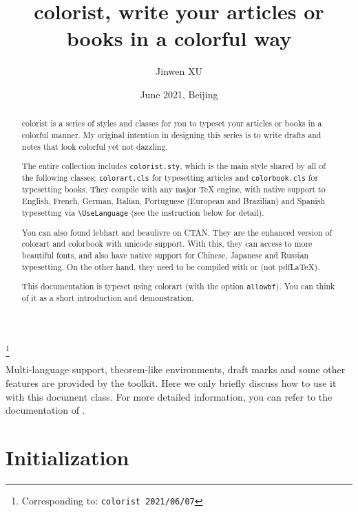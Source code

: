 \documentclass[allowbf,puretext]{colorart}
\theoremstyle{basic}
\theoremstyle{emphasis}
\theoremstyle{simple}
\newenvironment{tip}[1][Tip]{%
    \begin{tcolorbox}[breakable,
        enhanced,
        width = \textwidth,
        colback = paper, colbacktitle = paper,
        colframe = gray!50, boxrule=0.2mm,
        coltitle = black,
        fonttitle = \sffamily,
        attach boxed title to top left = {yshift=-\tcboxedtitleheight/2, xshift=.5cm},
        boxed title style = {boxrule=0pt, colframe=paper},
        before skip = 0.3cm,
        after skip = 0.3cm,
        top = 3mm,
        bottom = 3mm,
        title={\scshape\sffamily #1}]%
}{\end{tcolorbox}}
\providecommand{\colorist}{{\normalfont\textsf{colorist}}}
\providecommand{\colorart}{{\normalfont\textsf{colorart}}}
\providecommand{\colorbook}{{\normalfont\textsf{colorbook}}}
\providecommand{\lebhart}{{\normalfont\textsf{lebhart}}}
\providecommand{\beaulivre}{{\normalfont\textsf{beaulivre}}}
\begin{document}
\title{{\normalfont\textbf{\textsf{colorist}}}, write your articles or books in a colorful way}
\author{Jinwen XU}
\thanks{Corresponding to: \texttt{\colorist{} 2021/06/07}}
\date{June 2021, Beijing}

\maketitle

\begin{abstract}
    \colorist{} is a series of styles and classes for you to typeset your articles or books in a colorful manner. My original intention in designing this series is to write drafts and notes that look colorful yet not dazzling.

    The entire collection includes \verb|colorist.sty|, which is the main style shared by all of the following classes; \verb|colorart.cls| for typesetting articles and \verb|colorbook.cls| for typesetting books. They compile with any major \TeX{} engine, with native support to English, French, German, Italian, Portuguese (European and Brazilian) and Spanish typesetting via \lstinline|\UseLanguage| (see the instruction below for detail).

    You can also found \lebhart{} and \beaulivre{} on CTAN. They are the enhanced version of \colorart{} and \colorbook{} with unicode support. With this, they can access to more beautiful fonts, and also have native support for Chinese, Japanese and Russian typesetting. On the other hand, they need to be compiled with  or  (not pdf\LaTeX).
    
    This documentation is typeset using \colorart{} (with the option \texttt{allowbf}). You can think of it as a short introduction and demonstration.
\end{abstract}

\tableofcontents

\bigskip\bigskip
\begin{tip}
    Multi-language support, theorem-like environments, draft marks and some other features are provided by the \ProjLib{} toolkit. Here we only briefly discuss how to use it with this document class. For more detailed information, you can refer to the documentation of \ProjLib{}.
\end{tip}

\clearpage
\section{Initialization}
\end{document}
